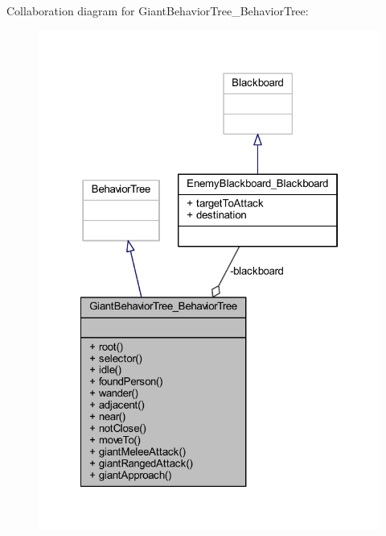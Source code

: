 Collaboration diagram for Giant\+Behavior\+Tree\+\_\+\+Behavior\+Tree\+:\nopagebreak
\begin{figure}[H]
\begin{center}
\leavevmode
\includegraphics[width=322pt]{class_giant_behavior_tree___behavior_tree__coll__graph}
\end{center}
\end{figure}
